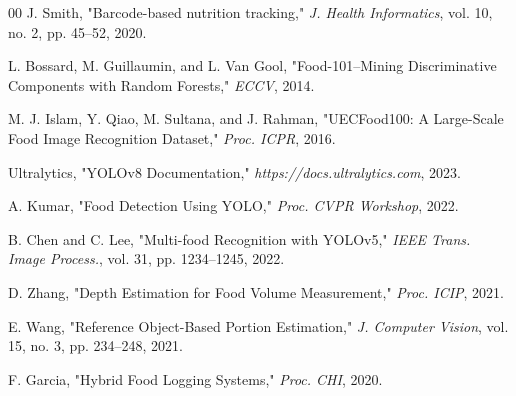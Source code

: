 \documentclass[conference]{IEEEtran}
\begin{document}
\begin{thebibliography}{00}
 J. Smith, "Barcode-based nutrition tracking," \textit{J. Health Informatics}, vol. 10, no. 2, pp. 45--52, 2020.

 L. Bossard, M. Guillaumin, and L. Van Gool, "Food-101--Mining Discriminative Components with Random Forests," \textit{ECCV}, 2014.

 M. J. Islam, Y. Qiao, M. Sultana, and J. Rahman, "UECFood100: A Large-Scale Food Image Recognition Dataset," \textit{Proc. ICPR}, 2016.

 Ultralytics, "YOLOv8 Documentation," \textit{https://docs.ultralytics.com}, 2023.

 A. Kumar, "Food Detection Using YOLO," \textit{Proc. CVPR Workshop}, 2022.

 B. Chen and C. Lee, "Multi-food Recognition with YOLOv5," \textit{IEEE Trans. Image Process.}, vol. 31, pp. 1234--1245, 2022.

 D. Zhang, "Depth Estimation for Food Volume Measurement," \textit{Proc. ICIP}, 2021.

 E. Wang, "Reference Object-Based Portion Estimation," \textit{J. Computer Vision}, vol. 15, no. 3, pp. 234--248, 2021.

 F. Garcia, "Hybrid Food Logging Systems," \textit{Proc. CHI}, 2020.
\end{thebibliography}
\end{document}
